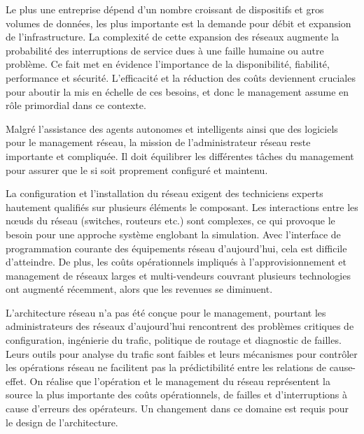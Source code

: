 
\clearpage

Le plus une entreprise dépend d'un nombre croissant de dispositifs et gros volumes de données, les plus importante est la demande pour débit et expansion de l'infrastructure. La complexité de cette expansion des réseaux augmente la probabilité des interruptions de service dues à une faille humaine ou autre problème. Ce fait met en évidence l'importance de la disponibilité, fiabilité, performance et sécurité. L'efficacité et la réduction des coûts deviennent cruciales pour aboutir la mis en échelle de ces besoins, et donc le management assume en rôle primordial dans ce contexte. \cite{IBMManagingGrowingPainsNeed}
 

Malgré l'assistance des agents autonomes et intelligents ainsi que des logiciels pour le management réseau, la mission de l'administrateur réseau reste importante et compliquée. Il doit équilibrer les différentes tâches du management pour assurer que le \gls{si} soit proprement configuré et maintenu. \cite{CentralIssuesNetworkManagementConclusion}

La configuration et l'installation du réseau exigent des techniciens experts hautement qualifiés sur plusieurs éléments le composant. Les interactions entre les nœuds du réseau (switches, routeurs etc.) sont complexes, ce qui provoque le besoin pour une approche système englobant la simulation. Avec l'interface de programmation courante des équipements réseau d'aujourd'hui, cela est difficile d'atteindre. De plus, les coûts opérationnels impliqués à l'approvisionnement et management de réseaux larges et multi-vendeurs  couvrant plusieurs technologies ont augmenté récemment, alors que les revenues se diminuent. \cite{ImplementationChallengesForSDN}

L'architecture réseau n'a pas été conçue pour le management, pourtant les administrateurs des réseaux d'aujourd'hui rencontrent des problèmes critiques de configuration, ingénierie du trafic, politique de routage et diagnostic de failles. Leurs outils pour analyse du trafic sont faibles et leurs mécanismes pour contrôler les opérations réseau ne facilitent pas la prédictibilité entre les relations de cause-effet. On réalise que l'opération et le management du réseau représentent la source la plus importante des coûts opérationnels, de failles et d'interruptions à cause d'erreurs des opérateurs. Un changement dans ce domaine est requis pour le design de l'architecture. \cite{NGSIManagement}

